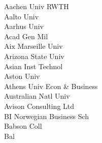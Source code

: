 \documentclass[a4paper]{article}
\begin{document}
\begin{multicols*}{2}
\begin{footnotesize}
Aachen Univ RWTH \\ Aalto Univ \\ Aarhus Univ \\ Acad Gen Mil \\ Aix Marseille Univ \\ Arizona State Univ \\ Asian Inst Technol \\ Aston Univ \\ Athens Univ Econ \& Business \\ Australian Natl Univ \\ Avison Consulting Ltd \\ BI Norwegian Business Sch \\ Babson Coll \\ Bal
\end{footnotesize}
\end{multicols*}
\end{document}
